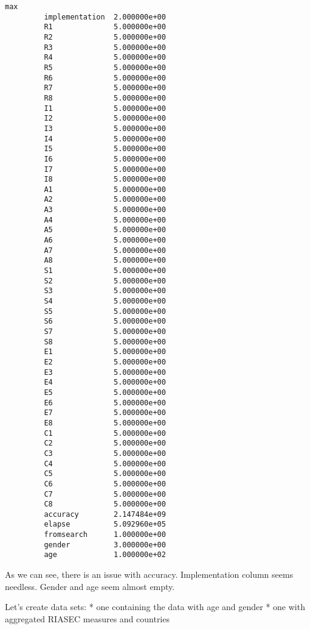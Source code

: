 \documentclass[11pt]{article}
\begin{document}
\begin{Verbatim}[commandchars=\\\{\}]
                                  max  
         implementation  2.000000e+00  
         R1              5.000000e+00  
         R2              5.000000e+00  
         R3              5.000000e+00  
         R4              5.000000e+00  
         R5              5.000000e+00  
         R6              5.000000e+00  
         R7              5.000000e+00  
         R8              5.000000e+00  
         I1              5.000000e+00  
         I2              5.000000e+00  
         I3              5.000000e+00  
         I4              5.000000e+00  
         I5              5.000000e+00  
         I6              5.000000e+00  
         I7              5.000000e+00  
         I8              5.000000e+00  
         A1              5.000000e+00  
         A2              5.000000e+00  
         A3              5.000000e+00  
         A4              5.000000e+00  
         A5              5.000000e+00  
         A6              5.000000e+00  
         A7              5.000000e+00  
         A8              5.000000e+00  
         S1              5.000000e+00  
         S2              5.000000e+00  
         S3              5.000000e+00  
         S4              5.000000e+00  
         S5              5.000000e+00  
         S6              5.000000e+00  
         S7              5.000000e+00  
         S8              5.000000e+00  
         E1              5.000000e+00  
         E2              5.000000e+00  
         E3              5.000000e+00  
         E4              5.000000e+00  
         E5              5.000000e+00  
         E6              5.000000e+00  
         E7              5.000000e+00  
         E8              5.000000e+00  
         C1              5.000000e+00  
         C2              5.000000e+00  
         C3              5.000000e+00  
         C4              5.000000e+00  
         C5              5.000000e+00  
         C6              5.000000e+00  
         C7              5.000000e+00  
         C8              5.000000e+00  
         accuracy        2.147484e+09  
         elapse          5.092960e+05  
         fromsearch      1.000000e+00  
         gender          3.000000e+00  
         age             1.000000e+02  
\end{Verbatim}
        
    As we can see, there is an issue with accuracy. Implementation column
seems needless. Gender and age seem almost empty.

Let's create data sets: * one containing the data with age and gender *
one with aggregated RIASEC measures and countries
\end{document}

